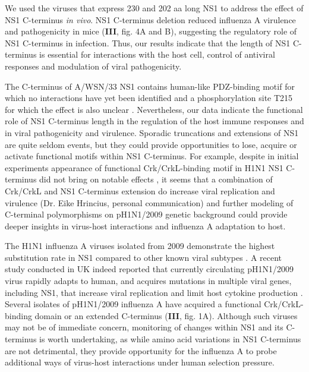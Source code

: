 		We used the viruses that express 230 and 202 aa long NS1 to address the effect of NS1 C-terminus \textit{in vivo}. NS1 C-terminus deletion reduced influenza A virulence and pathogenicity in mice (\textbf{III}, fig. 4A and B), suggesting the regulatory role of NS1 C-terminus in infection. Thus, our results indicate that the length of NS1 C-terminus is essential for interactions with the host cell, control of antiviral responses and modulation of viral pathogenicity. 
		
		The C-terminus of A/WSN/33 NS1 contains human-like PDZ-binding motif for which no interactions have yet been identified and a phosphorylation site T215 for which the effect is also unclear \parencite{Jackson2010, Hsiang2012}. Nevertheless, our data indicate the functional role of NS1 C-terminus length in the regulation of the host immune responses and in viral pathogenicity and virulence. Sporadic truncations and extensions of NS1 are quite seldom events, but they could provide opportunities to lose, acquire or activate functional motifs within NS1 C-terminus. For example, despite in initial experiments appearance of functional Crk/CrkL-binding motif in H1N1 NS1 C-terminus did not bring on notable effects \parencite{Hale2010e}, it seems that a combination of Crk/CrkL and NS1 C-terminus extension do increase viral replication and virulence (Dr. Eike Hrincius, personal communication) and further modeling of C-terminal polymorphisms on pH1N1/2009 genetic background could provide deeper insights in virus-host interactions and influenza A adaptation to host.
		
		The H1N1 influenza A viruses isolated from 2009 demonstrate the highest substitution rate in NS1 compared to other known viral subtypes \parencite{Xu2011}. A recent study conducted in UK indeed reported that currently circulating pH1N1/2009 virus rapidly adapts to human, and acquires mutations in multiple viral genes, including NS1, that increase viral replication and limit host cytokine production \parencite{Elderfield2014}. Several isolates of pH1N1/2009 influenza A have acquired a functional Crk/CrkL-binding domain or an extended C-terminus (\textbf{III}, fig. 1A). Although such viruses may not be of immediate concern, monitoring of changes within NS1 and its C-terminus is worth undertaking, as while amino acid variations in NS1 C-terminus are not detrimental, they provide opportunity for the influenza A to probe additional ways of virus-host interactions under human selection pressure.
		
		 
